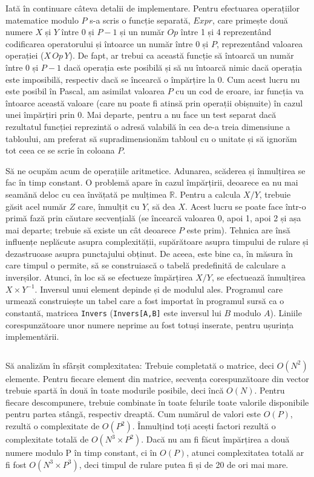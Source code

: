Iată în continuare câteva detalii de implementare. Pentru efectuarea
operațiilor matematice modulo $P$ s-a scris o funcție separată, $Expr$, care
primește două numere $X$ și $Y$ între 0 și $P-1$ și un număr $Op$ între 1 și 4
reprezentând codificarea operatorului și întoarce un număr între 0 și $P$,
reprezentând valoarea operației ($X\,Op\,Y$). De fapt, ar trebui ca această
funcție să întoarcă un număr între 0 și $P-1$ dacă operația este posibilă și
să nu întoarcă nimic dacă operația este imposibilă, respectiv dacă se încearcă
o împărțire la 0. Cum acest lucru nu este posibil în Pascal, am asimilat
valoarea $P$ cu un cod de eroare, iar funcția va întoarce această valoare
(care nu poate fi atinsă prin operații obișnuite) în cazul unei împărțiri prin
0. Mai departe, pentru a nu face un test separat dacă rezultatul funcției
reprezintă o adresă valabilă în cea de-a treia dimensiune a tabloului, am
preferat să supradimensionăm tabloul cu o unitate și să ignorăm tot ceea ce se
scrie în coloana $P$.

Să ne ocupăm acum de operațiile aritmetice. Adunarea, scăderea și înmulțirea
se fac în timp constant. O problemă apare în cazul împărțirii, deoarece ea nu
mai seamănă deloc cu cea învățată pe mulțimea $\mathbb{R}$. Pentru a calcula
$X/Y$, trebuie găsit acel număr $Z$ care, înmulțit cu $Y$, să dea $X$. Acest
lucru se poate face într-o primă fază prin căutare secvențială (se încearcă
valoarea 0, apoi 1, apoi 2 și așa mai departe; trebuie să existe un cât
deoarece $P$ este prim). Tehnica are însă influențe neplăcute asupra
complexității, supărătoare asupra timpului de rulare și dezastruoase asupra
punctajului obținut. De aceea, este bine ca, în măsura în care timpul o
permite, să se construiască o tabelă predefinită de calculare a
inverșilor. Atunci, în loc să se efectueze împărțirea $X/Y$, se efectuează
înmulțirea $X \times Y^{-1}$. Inversul unui element depinde și de modulul
ales. Programul care urmează construiește un tabel care a fost importat în
programul sursă ca o constantă, matricea {\tt Invers} ({\tt Invers[A,B]} este
inversul lui $B$ modulo $A$). Liniile corespunzătoare unor numere neprime au
fost totuși inserate, pentru ușurința implementării.

\inputminted{pascal}{src/problem10-1.pas}

Să analizăm în sfârșit complexitatea: Trebuie completată o matrice, deci
$O(N^2)$ elemente. Pentru fiecare element din matrice, secvența
corespunzătoare din vector trebuie spartă în două în toate modurile posibile,
deci încă $O(N)$. Pentru fiecare descompunere, trebuie combinate în toate
felurile toate valorile disponibile pentru partea stângă, respectiv
dreaptă. Cum numărul de valori este $O(P)$, rezultă o complexitate de
$O(P^2)$. Înmulțind toți acești factori rezultă o complexitate totală de
$O(N^3 \times P^2)$. Dacă nu am fi făcut împărțirea a două numere modulo P în
timp constant, ci în $O(P)$, atunci complexitatea totală ar fi fost $O(N^3
\times P^3)$, deci timpul de rulare putea fi și de 20 de ori mai mare.

